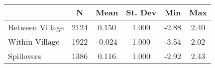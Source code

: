 \begin{tabular}{l*{5}{c}}\hline&\multicolumn{1}{c}{N}&\multicolumn{1}{c}{Mean}&\multicolumn{1}{c}{St. Dev}&\multicolumn{1}{c}{Min}&\multicolumn{1}{c}{Max}\\ \hline 
Between Village & 2124 & 0.150 & 1.000 & -2.88 & 2.40 \\
Within Village & 1922 & -0.024 & 1.000 & -3.54 & 2.02 \\
Spillovers & 1386 & 0.116 & 1.000 & -2.92 & 2.43 \\
\hline \end{tabular}
